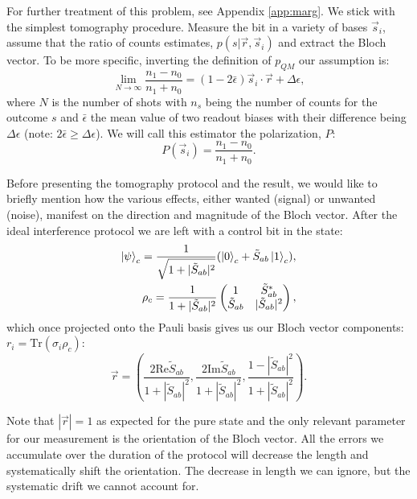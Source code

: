 \documentclass[two column]{article}
\begin{document}
For further treatment of this problem, see Appendix \ref{app:marg}.
We stick with the simplest tomography procedure.
Measure the bit in a variety of bases $\vec{s}_i$, assume that the ratio of counts estimates, $p(s|\vec{r}, \vec{s}_i)$ and extract the Bloch vector.
To be more specific, inverting the definition of $p_{QM}$ our assumption is:
\begin{equation}
    \lim_{N \rightarrow \infty} \frac{n_1-n_0}{n_1+n_0} = (1-2\bar\epsilon)\vec{s}_i \cdot \vec{r} + \Delta\epsilon,\label{eqn:estim}
\end{equation}
where $N$ is the number of shots with $n_s$ being the number of counts for the outcome $s$ and $\bar\epsilon$ the mean value of two readout biases with their difference being $\Delta\epsilon$ (note: $2\bar\epsilon \geq \Delta\epsilon$).
We will call this estimator the polarization, $P$:
\begin{equation}
    P(\vec{s}_i) = \frac{n_1-n_0}{n_1+n_0}.
\end{equation}

Before presenting the tomography protocol and the result, we would like to briefly mention how the various effects, either wanted (signal) or unwanted (noise), manifest on the direction and magnitude of the Bloch vector.
After the ideal interference protocol we are left with a control bit in the state:
\begin{equation}
\begin{split}
    \ket{\psi}_c = \frac{1}{\sqrt{1+|\tilde{S}_{ab}|^2}}(\ket{0}_c + \tilde{S}_{ab}\ket{1}_c),\\
    \rho_c = \frac{1}{1+|\tilde{S}_{ab}|^2}\begin{pmatrix}
    1 & \tilde{S}_{ab}^* \\
    \tilde{S}_{ab} & |\tilde{S}_{ab}|^2
    \end{pmatrix},
\end{split}
\end{equation}
which once projected onto the Pauli basis gives us our Bloch vector components: $r_i = \text{Tr}(\sigma_i\rho_c)$:
\begin{equation}
    \vec{r} = \left( \frac{2 \text{Re}\tilde{S}_{ab}}{1+|\tilde{S}_{ab}|^2}, \frac{2 \text{Im}\tilde{S}_{ab}}{1+|\tilde{S}_{ab}|^2}, \frac{1 - |\tilde{S}_{ab}|^2}{1+|\tilde{S}_{ab}|^2} \right).\label{eqn:bloch}
\end{equation}

Note that $|\vec{r}| = 1$ as expected for the pure state and the only relevant parameter for our measurement is the orientation of the Bloch vector. 
All the errors we accumulate over the duration of the protocol will decrease the length and systematically shift the orientation.
The decrease in length we can ignore, but the systematic drift we cannot account for.
\end{document}
